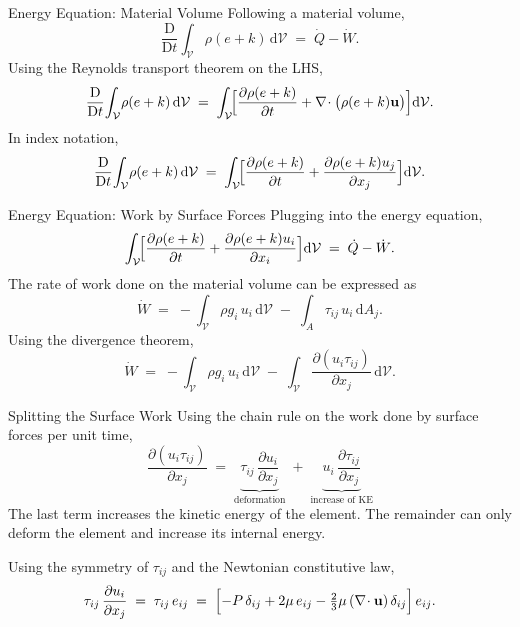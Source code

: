\documentclass[10pt,aspectratio=43]{beamer}
\newcommand{\dd}{\mathrm{d}}
\newcommand{\D}{\mathrm{D}}
\newcommand{\pd}[2]{\frac{\partial #1}{\partial #2}}
\newcommand{\bu}{\mathbf{u}}
\newcommand{\divg}{\nabla\!\cdot}
\newcommand{\Vol}{\mathcal{V}}
\begin{document}
\begin{frame}{Energy Equation: Material Volume}
  Following a material volume,
  \[
    \frac{\D}{\D t}\!\int_{\Vol}\!\rho(e+k)\,\dd\Vol
      \;=\; \dot{Q} - \dot{W}.
  \]
  Using the Reynolds transport theorem on the LHS,
  \[
    \frac{\D}{\D t}\!\int_{\Vol}\!\rho(e+k)\,\dd\Vol
      \;=\; \int_{\Vol}\!\Bigl[\pd{\rho(e+k)}{t} + \divg\bigl(\rho(e+k)\bu\bigr)\Bigr]\dd\Vol.
  \]
  In index notation,
  \[
    \frac{\D}{\D t}\!\int_{\Vol}\!\rho(e+k)\,\dd\Vol
      \;=\; \int_{\Vol}\!\Bigl[\pd{\rho(e+k)}{t} + \pd{\rho(e+k)u_{j}}{x_{j}}\Bigr]\dd\Vol.
  \]
\end{frame}

\begin{frame}{Energy Equation: Work by Surface Forces}
  Plugging into the energy equation,
  \[
    \int_{\Vol}\!\Bigl[\pd{\rho(e+k)}{t} + \pd{\rho(e+k)u_{i}}{x_{i}}\Bigr]\dd\Vol
      \;=\; \dot{Q} - \dot{W}.
  \]
  The rate of work done on the material volume can be expressed as
  \[
    \dot{W} \;=\; -\int_{\Vol}\!\rho g_{i}\,u_{i}\,\dd\Vol \;-\; \int_{A}\!\tau_{ij}\,u_{i}\,\dd A_{j}.
  \]
  Using the divergence theorem,
  \[
    \dot{W} \;=\; -\int_{\Vol}\!\rho g_{i}\,u_{i}\,\dd\Vol
                  \;-\; \int_{\Vol}\!\pd{(u_{i}\tau_{ij})}{x_{j}}\,\dd\Vol.
  \]
\end{frame}

\begin{frame}{Splitting the Surface Work}
  Using the chain rule on the work done by surface forces per unit time,
  \[
    \pd{(u_{i}\tau_{ij})}{x_{j}}
      \;=\; \underbrace{\tau_{ij}\,\pd{u_{i}}{x_{j}}}_{\text{deformation}}
        \;+\; \underbrace{u_{i}\,\pd{\tau_{ij}}{x_{j}}}_{\text{increase of KE}}
  \]
  The last term increases the kinetic energy of the element. The remainder
  can only deform the element and increase its internal energy.

  \medskip
  Using the symmetry of $\tau_{ij}$ and the Newtonian constitutive law,
  \[
    \tau_{ij}\,\pd{u_{i}}{x_{j}}
      \;=\; \tau_{ij}\,e_{ij}
      \;=\; \Bigl[-P\,\delta_{ij} + 2\mu\,e_{ij} - \tfrac{2}{3}\mu\,(\divg\bu)\,\delta_{ij}\Bigr]\,e_{ij}.
  \]
\end{frame}
\end{document}
